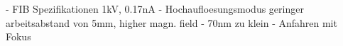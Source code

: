 	- FIB Spezifikationen 1kV, 0.17nA 
	- Hochaufloesungsmodus geringer arbeitsabstand von 5mm, higher magn. field
	- 70nm \nds zu klein
	- Anfahren mit Fokus



